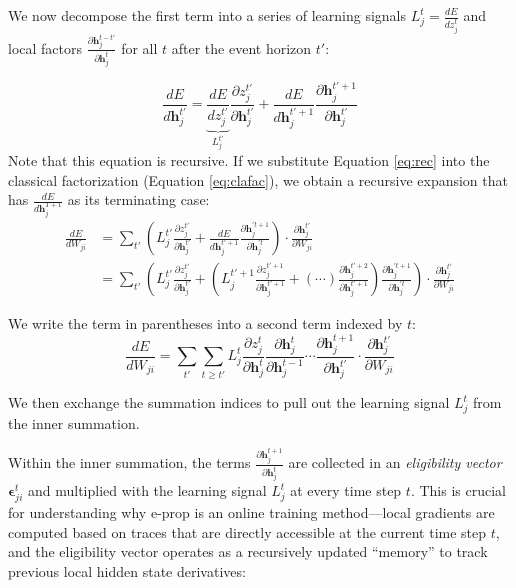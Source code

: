         We now decompose the first term into a series of learning signals $L_j^t = \frac{dE}{dz_j^t}$ and local factors $\frac{\partial\mathbf{h}_j^{t-t'}}{\partial\mathbf{h}_j^t}$ for all $t$ after the event horizon $t'$:

        \begin{equation}\label{eq:rec}
        \frac{dE}{d\mathbf{h}_j^{t'}} = \underbrace{\frac{dE}{dz_j^{t'}}}_{L^{t'}_j} \frac{\partial z_j^{t'}}{\partial\mathbf{h}_j^{t'}} + \frac{dE}{d\mathbf{h}_j^{t'+1}}\frac{\partial\mathbf{h}_j^{t'+1}}{\partial\mathbf{h}_j^{t'}}
        \end{equation}
        Note that this equation is recursive.
        If we substitute Equation \ref{eq:rec} into the classical factorization (Equation \ref{eq:clafac}), we obtain a recursive expansion that has $\frac{dE}{d\mathbf{h}^{T+1}_j}$ as its terminating case:
        \begin{align}
        \frac{dE}{dW_{ji}} &= \sum_{t'}\left(L_j^{t'}\frac{\partial z_j^{t'}}{\partial\mathbf{h}_j^{t'}} + \frac{dE}{d\mathbf{h}_j^{t'+1}}\frac{\partial\mathbf{h}_j^{'t+1}}{\partial\mathbf{h}_j^{'t}}\right)\cdot\frac{\partial\mathbf{h}_j^{t'}}{\partial W_{ji}}\\
        &= \sum_{t'}\left(L_j^{t'}\frac{\partial z_j^{t'}}{\partial\mathbf{h}_j^{t'}} + \left( L^{t'+1}_j \frac{\partial z_j^{t'+1}}{\partial\mathbf{h}_j^{t'+1}} + (\cdots)\frac{\partial\mathbf{h}_j^{t'+2}}{\partial\mathbf{h}_j^{t'+1}}  \right) \frac{\partial\mathbf{h}_j^{'t+1}}{\partial\mathbf{h}_j^{'t}}\right)\cdot\frac{\partial\mathbf{h}_j^{t'}}{\partial W_{ji}}
        \end{align}

        We write the term in parentheses into a second term indexed by $t$:
        \begin{equation}
        \frac{dE}{dW_{ji}} = \sum_{t'}\sum_{t\geq t'}L^t_j\frac{\partial z_j^t}{\partial\mathbf{h}_j^t}\frac{\partial\mathbf{h}^t_j}{\partial\mathbf{h}_j^{t-1}} \cdots \frac{\partial\mathbf{h}_j^{t+1}}{\partial\mathbf{h}_j^{t'}}\cdot\frac{\partial\mathbf{h}_j^{t'}}{\partial W_{ji}}
        \end{equation}

        We then exchange the summation indices to pull out the learning signal $L_j^t$ from the inner summation.

        Within the inner summation, the terms $\frac{\partial\mathbf{h}_j^{t+1}}{\partial\mathbf{h}_j^t}$ are collected in an \emph{eligibility vector} $\mathbf{\epsilon}^t_{ji}$ and multiplied with the learning signal $L^t_j$ at every time step $t$.
        This is crucial for understanding why e-prop is an online training method---local gradients are computed based on traces that are directly accessible at the current time step $t$, and the eligibility vector operates as a recursively updated ``memory'' to track previous local hidden state derivatives:


